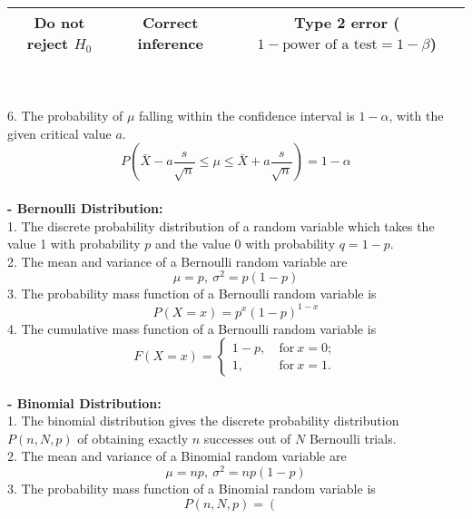 \documentclass{article}
\begin{document}
\begin{enumerate}[S1 - ]
\begin{tabular}{ccc}
    Do not reject $H_0$ & Correct inference & Type 2 error ($1 - \text{power of a test} = 1 - \beta$)\\
    \hline
    \end{tabular}\\
    \\
    6. The probability of $\mu$ falling within the confidence interval is $1 - \alpha$, with the given critical value $a$.
    \begin{equation*}
    P\left(\bar{X}-a\frac{s}{\sqrt{n}} \leq \mu \leq \bar{X}+a\frac{s}{\sqrt{n}} \right) = 1 - \alpha
    \end{equation*}
    \\
    \textbf{- Bernoulli Distribution:}\\
    1. The discrete probability distribution of a random variable which takes the value 1 with probability $p$ and the value 0 with probability $q=1-p$.\\
    2. The mean and variance of a Bernoulli random variable are
    \begin{equation*}
    \mu = p, \ \sigma^2 = p(1-p)
    \end{equation*}
    3. The probability mass function of a Bernoulli random variable is
    \begin{equation*}
    P(X=x) = p^{x}(1-p)^{1-x}
    \end{equation*}
    4. The cumulative mass function of a Bernoulli random variable is
    \begin{equation*}
    F(X=x) = \left\{
    \begin{aligned}
    1-p, & \ \text{for}\ x = 0;\\
    1, & \ \text{for}\ x = 1.
    \end{aligned}
    \right.
    \end{equation*}
    \\
    \textbf{- Binomial Distribution:}\\
    1. The binomial distribution gives the discrete probability distribution $P(n,N,p)$ of obtaining exactly $n$ successes out of $N$ Bernoulli trials.\\
    2. The mean and variance of a Binomial random variable are
    \begin{equation*}
    \mu = np, \ \sigma^2 = np(1-p)
    \end{equation*} 
    3. The probability mass function of a Binomial random variable is
    \begin{equation*}
    P(n,N,p) = \left(\begin{aligned}

\end{aligned}
\end{equation*}
\end{enumerate}
\end{document}
